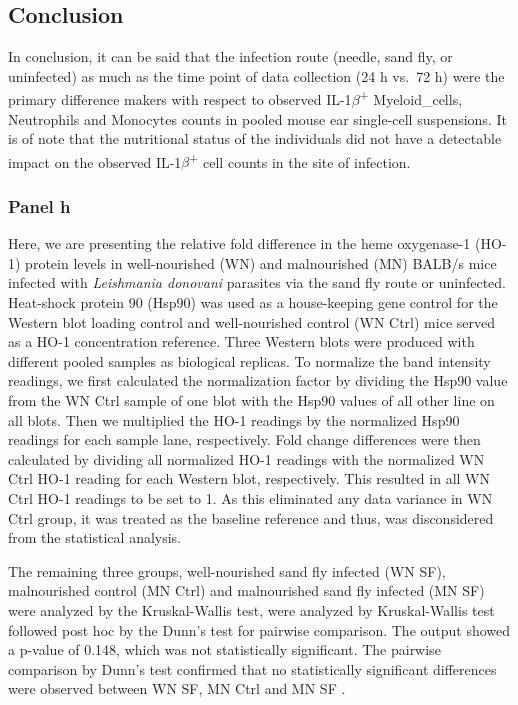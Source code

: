 \documentclass[
  12pt,
  letterpaper,
]{article}
\begin{document}
\endgroup

\subsection{Conclusion}\label{conclusion-1}

In conclusion, it can be said that the infection route (needle, sand fly, or uninfected) as much as the time point of data collection (24 h vs.~72 h) were the primary difference makers with respect to observed IL-1\(\beta\)\textsuperscript{+} Myeloid\_cells, Neutrophils and Monocytes counts in pooled mouse ear single-cell suspensions. It is of note that the nutritional status of the individuals did not have a detectable impact on the observed IL-1\(\beta\)\textsuperscript{+} cell counts in the site of infection.

\subsubsection{Panel h}\label{panel-h}

Here, we are presenting the relative fold difference in the heme oxygenase-1 (HO-1) protein levels in well-nourished (WN) and malnourished (MN) BALB/s mice infected with \emph{Leishmania donovani} parasites via the sand fly route or uninfected. Heat-shock protein 90 (Hsp90) was used as a house-keeping gene control for the Western blot loading control and well-nourished control (WN Ctrl) mice served as a HO-1 concentration reference. Three Western blots were produced with different pooled samples as biological replicas. To normalize the band intensity readings, we first calculated the normalization factor by dividing the Hsp90 value from the WN Ctrl sample of one blot with the Hsp90 values of all other line on all blots. Then we multiplied the HO-1 readings by the normalized Hsp90 readings for each sample lane, respectively. Fold change differences were then calculated by dividing all normalized HO-1 readings with the normalized WN Ctrl HO-1 reading for each Western blot, respectively. This resulted in all WN Ctrl HO-1 readings to be set to 1. As this eliminated any data variance in WN Ctrl group, it was treated as the baseline reference and thus, was disconsidered from the statistical analysis.

The remaining three groups, well-nourished sand fly infected (WN SF), malnourished control (MN Ctrl) and malnourished sand fly infected (MN SF) were analyzed by the Kruskal-Wallis test, were analyzed by Kruskal-Wallis test followed post hoc by the Dunn's test for pairwise comparison. The output showed a p-value of 0.148, which was not statistically significant. The pairwise comparison by Dunn's test confirmed that no statistically significant differences were observed between WN SF, MN Ctrl and MN SF .
\end{document}
